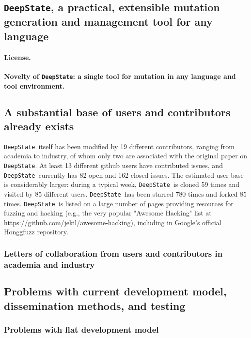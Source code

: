 \documentclass[numbers]{proposalnsf}
\newcommand{\ds}{\texttt{DeepState}}
\begin{document}
\subsection{\ds,  a practical, extensible mutation generation and management tool for any language}

\paragraph{License.}

\paragraph{Novelty of \ds: a single tool for mutation in any language and tool environment.}



\subsection{A substantial base of users and contributors already exists}

\ds\ itself has been modified by 19 different contributors, ranging from academia to industry, of whom only two are associated with the original paper on \ds. At least 13
 different github users have contributed issues, and \ds\ currently has 82 open and 162 closed issues.  The estimated user base is considerably larger:  during a typical week, \ds\ is cloned 59 times and visited by 85 different users.  \ds\ has been starred 780 times and forked 85 times.  \ds\ is listed on a large number of pages providing resources for fuzzing and hacking (e.g., the very popular "Awesome Hacking" list at https://github.com/jekil/awesome-hacking), including in Google's official Honggfuzz repository.

\subsubsection{Letters of collaboration from users and contributors in academia and industry}


\subsection{Problems with current development model, dissemination methods, and testing}

\subsubsection{Problems with flat development model}
\end{document}
